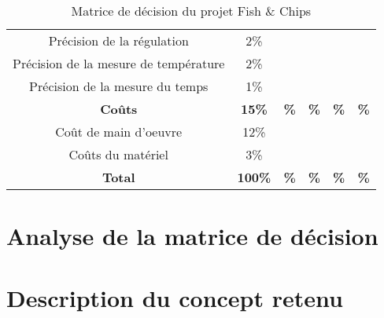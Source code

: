 \begin{table}[htp]
{\begin{tabular}{|c|c||c|c|c|c|}
        Précision de la régulation & 2\% & & & & \\
        Précision de la mesure de température & 2\% & & & & \\
        Précision de la mesure du temps & 1\% & & & & \\
        \hline\hline
        \textbf{Coûts} & \textbf{15\%} &\textbf{ \%} & \textbf{ \%}& \textbf{ \%}&\textbf{ \%} \\
        \hline
        Coût de main d'oeuvre & 12\% & & & & \\
        Coûts du matériel & 3\% & & & & \\
        \hline\hline
        \textbf{Total} & \textbf{100\%} &\textbf{ \%} &\textbf{ \%} &\textbf{ \%} &\textbf{ \%} \\
        \hline
   \end{tabular}}
    \caption{Matrice de décision du projet Fish \& Chips}
    \label{t:criteres}
\end{table}



\section{Analyse de la matrice de décision}

\section{Description du concept retenu}



